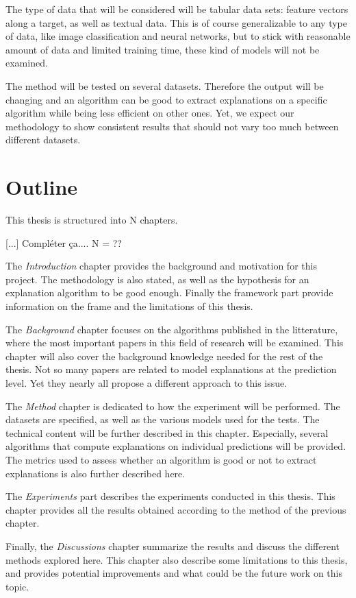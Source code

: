 \documentclass[a4paper,11pt]{kth-mag}
\begin{document}
The type of data that will be considered will be tabular data sets: feature vectors along a target, as well as textual data. This is of course generalizable to any type of data, like image classification and neural networks, but to stick with reasonable amount of data and limited training time, these kind of models will not be examined.

The method will be tested on several datasets. Therefore the output will be changing and an algorithm can be good to extract explanations on a specific algorithm while being less efficient on other ones. Yet, we expect our methodology to show consistent results that should not vary too much between different datasets.

\section{Outline}

This thesis is structured into N chapters.

[...] Compléter ça.... N = ??


The \textit{Introduction} chapter provides the background and motivation for this project. The methodology is also stated, as well as the hypothesis for an explanation algorithm to be good enough. Finally the framework part provide information on the frame and the limitations of this thesis.

The \textit{Background} chapter focuses on the algorithms published in the litterature, where the most important papers in this field of research will be examined. This chapter will also cover the background knowledge needed for the rest of the thesis. Not so many papers are related to model explanations at the prediction level. Yet they nearly all propose a different approach to this issue.

The \textit{Method} chapter is dedicated to how the experiment will be performed. The datasets are specified, as well as the various models used for the tests. The technical content will be further described in this chapter. Especially, several algorithms that compute explanations on individual predictions will be provided. The metrics used to assess whether an algorithm is good or not to extract explanations is also further described here.

The \textit{Experiments} part describes the experiments conducted in this thesis. This chapter provides all the results obtained according to the method of the previous chapter.

Finally, the \textit{Discussions} chapter summarize the results and discuss the different methods explored here. This chapter also describe some limitations to this thesis, and provides potential improvements and what could be the future work on this topic.
\end{document}
